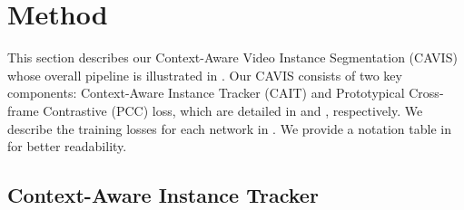 \documentclass[10pt,twocolumn,letterpaper]{article}
\begin{document}
\section{Method}
This section describes our Context-Aware Video Instance Segmentation (CAVIS) whose overall pipeline is illustrated in .
Our CAVIS consists of two key components: Context-Aware Instance Tracker (CAIT) and Prototypical Cross-frame Contrastive (PCC) loss, which are detailed in  and , respectively.
We describe the training losses for each network in .
We provide a notation table in  for better readability.







\subsection{Context-Aware Instance Tracker}
\label{sec:catf}
\end{document}
